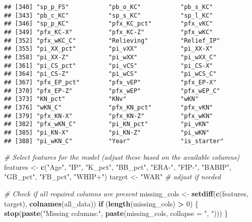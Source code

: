 \documentclass[
]{article}
\newenvironment{Shaded}{\begin{snugshade}}{\end{snugshade}}
\newcommand{\AttributeTok}[1]{\textcolor[rgb]{0.13,0.29,0.53}{#1}}
\newcommand{\CommentTok}[1]{\textcolor[rgb]{0.56,0.35,0.01}{\textit{#1}}}
\newcommand{\ControlFlowTok}[1]{\textcolor[rgb]{0.13,0.29,0.53}{\textbf{#1}}}
\newcommand{\DecValTok}[1]{\textcolor[rgb]{0.00,0.00,0.81}{#1}}
\newcommand{\FunctionTok}[1]{\textcolor[rgb]{0.13,0.29,0.53}{\textbf{#1}}}
\newcommand{\NormalTok}[1]{#1}
\newcommand{\OtherTok}[1]{\textcolor[rgb]{0.56,0.35,0.01}{#1}}
\newcommand{\SpecialCharTok}[1]{\textcolor[rgb]{0.81,0.36,0.00}{\textbf{#1}}}
\newcommand{\StringTok}[1]{\textcolor[rgb]{0.31,0.60,0.02}{#1}}
\begin{document}
\begin{verbatim}
## [340] "sp_p_FS"           "pb_o_KC"           "pb_s_KC"          
## [343] "pb_c_KC"           "sp_s_KC"           "sp_l_KC"          
## [346] "sp_p_KC"           "pfx_KC_pct"        "pfx_vKC"          
## [349] "pfx_KC-X"          "pfx_KC-Z"          "pfx_wKC"          
## [352] "pfx_wKC_C"         "Relieving"         "Relief_IP"        
## [355] "pi_XX_pct"         "pi_vXX"            "pi_XX-X"          
## [358] "pi_XX-Z"           "pi_wXX"            "pi_wXX_C"         
## [361] "pi_CS_pct"         "pi_vCS"            "pi_CS-X"          
## [364] "pi_CS-Z"           "pi_wCS"            "pi_wCS_C"         
## [367] "pfx_EP_pct"        "pfx_vEP"           "pfx_EP-X"         
## [370] "pfx_EP-Z"          "pfx_wEP"           "pfx_wEP_C"        
## [373] "KN_pct"            "KNv"               "wKN"              
## [376] "wKN_C"             "pfx_KN_pct"        "pfx_vKN"          
## [379] "pfx_KN-X"          "pfx_KN-Z"          "pfx_wKN"          
## [382] "pfx_wKN_C"         "pi_KN_pct"         "pi_vKN"           
## [385] "pi_KN-X"           "pi_KN-Z"           "pi_wKN"           
## [388] "pi_wKN_C"          "Year"              "is_starter"
\end{verbatim}

\begin{Shaded}
\begin{Highlighting}[]
\CommentTok{\# Select features for the model (adjust these based on the available columns)}
\NormalTok{features }\OtherTok{\textless{}{-}} \FunctionTok{c}\NormalTok{(}\StringTok{"Age"}\NormalTok{, }\StringTok{"IP"}\NormalTok{, }\StringTok{"K\_pct"}\NormalTok{, }\StringTok{"BB\_pct"}\NormalTok{, }\StringTok{"ERA{-}"}\NormalTok{, }\StringTok{"FIP{-}"}\NormalTok{, }\StringTok{"BABIP"}\NormalTok{, }\StringTok{"GB\_pct"}\NormalTok{, }\StringTok{"FB\_pct"}\NormalTok{, }\StringTok{"WHIP+"}\NormalTok{)}
\NormalTok{target }\OtherTok{\textless{}{-}} \StringTok{"WAR"}  \CommentTok{\# adjust if needed}
\end{Highlighting}
\end{Shaded}

\begin{Shaded}
\begin{Highlighting}[]
\CommentTok{\# Check if all required columns are present}
\NormalTok{missing\_cols }\OtherTok{\textless{}{-}} \FunctionTok{setdiff}\NormalTok{(}\FunctionTok{c}\NormalTok{(features, target), }\FunctionTok{colnames}\NormalTok{(all\_data))}
\ControlFlowTok{if}\NormalTok{ (}\FunctionTok{length}\NormalTok{(missing\_cols) }\SpecialCharTok{\textgreater{}} \DecValTok{0}\NormalTok{) \{}
  \FunctionTok{stop}\NormalTok{(}\FunctionTok{paste}\NormalTok{(}\StringTok{"Missing columns:"}\NormalTok{, }\FunctionTok{paste}\NormalTok{(missing\_cols, }\AttributeTok{collapse =} \StringTok{", "}\NormalTok{)))}
\NormalTok{\}}
\end{Highlighting}
\end{Shaded}
\end{document}
